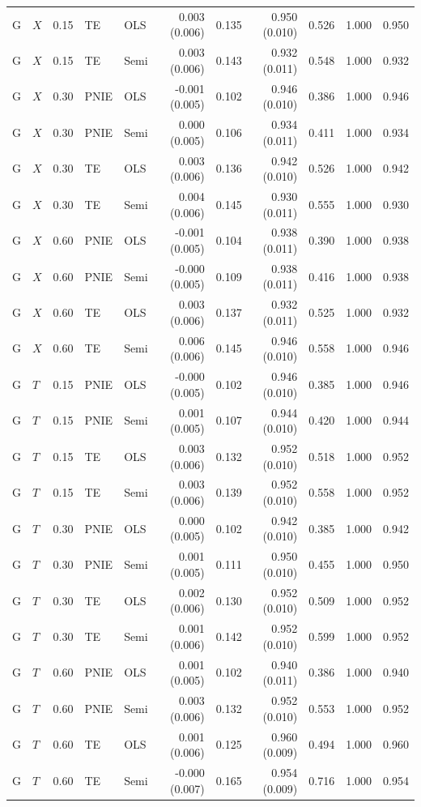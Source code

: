 \begin{longtable}{llrllrrrrrr}
G & $X$ & 0.15 & TE & OLS & 0.003 (0.006) & 0.135 & 0.950 (0.010) & 0.526 & 1.000 & 0.950\\
G & $X$ & 0.15 & TE & Semi & 0.003 (0.006) & 0.143 & 0.932 (0.011) & 0.548 & 1.000 & 0.932\\
G & $X$ & 0.30 & PNIE & OLS & -0.001 (0.005) & 0.102 & 0.946 (0.010) & 0.386 & 1.000 & 0.946\\
G & $X$ & 0.30 & PNIE & Semi & 0.000 (0.005) & 0.106 & 0.934 (0.011) & 0.411 & 1.000 & 0.934\\
G & $X$ & 0.30 & TE & OLS & 0.003 (0.006) & 0.136 & 0.942 (0.010) & 0.526 & 1.000 & 0.942\\
G & $X$ & 0.30 & TE & Semi & 0.004 (0.006) & 0.145 & 0.930 (0.011) & 0.555 & 1.000 & 0.930\\
G & $X$ & 0.60 & PNIE & OLS & -0.001 (0.005) & 0.104 & 0.938 (0.011) & 0.390 & 1.000 & 0.938\\
G & $X$ & 0.60 & PNIE & Semi & -0.000 (0.005) & 0.109 & 0.938 (0.011) & 0.416 & 1.000 & 0.938\\
G & $X$ & 0.60 & TE & OLS & 0.003 (0.006) & 0.137 & 0.932 (0.011) & 0.525 & 1.000 & 0.932\\
G & $X$ & 0.60 & TE & Semi & 0.006 (0.006) & 0.145 & 0.946 (0.010) & 0.558 & 1.000 & 0.946\\
G & $T$ & 0.15 & PNIE & OLS & -0.000 (0.005) & 0.102 & 0.946 (0.010) & 0.385 & 1.000 & 0.946\\
G & $T$ & 0.15 & PNIE & Semi & 0.001 (0.005) & 0.107 & 0.944 (0.010) & 0.420 & 1.000 & 0.944\\
G & $T$ & 0.15 & TE & OLS & 0.003 (0.006) & 0.132 & 0.952 (0.010) & 0.518 & 1.000 & 0.952\\
G & $T$ & 0.15 & TE & Semi & 0.003 (0.006) & 0.139 & 0.952 (0.010) & 0.558 & 1.000 & 0.952\\
G & $T$ & 0.30 & PNIE & OLS & 0.000 (0.005) & 0.102 & 0.942 (0.010) & 0.385 & 1.000 & 0.942\\
G & $T$ & 0.30 & PNIE & Semi & 0.001 (0.005) & 0.111 & 0.950 (0.010) & 0.455 & 1.000 & 0.950\\
G & $T$ & 0.30 & TE & OLS & 0.002 (0.006) & 0.130 & 0.952 (0.010) & 0.509 & 1.000 & 0.952\\
G & $T$ & 0.30 & TE & Semi & 0.001 (0.006) & 0.142 & 0.952 (0.010) & 0.599 & 1.000 & 0.952\\
G & $T$ & 0.60 & PNIE & OLS & 0.001 (0.005) & 0.102 & 0.940 (0.011) & 0.386 & 1.000 & 0.940\\
G & $T$ & 0.60 & PNIE & Semi & 0.003 (0.006) & 0.132 & 0.952 (0.010) & 0.553 & 1.000 & 0.952\\
G & $T$ & 0.60 & TE & OLS & 0.001 (0.006) & 0.125 & 0.960 (0.009) & 0.494 & 1.000 & 0.960\\
G & $T$ & 0.60 & TE & Semi & -0.000 (0.007) & 0.165 & 0.954 (0.009) & 0.716 & 1.000 & 0.954\\
\end{longtable}
